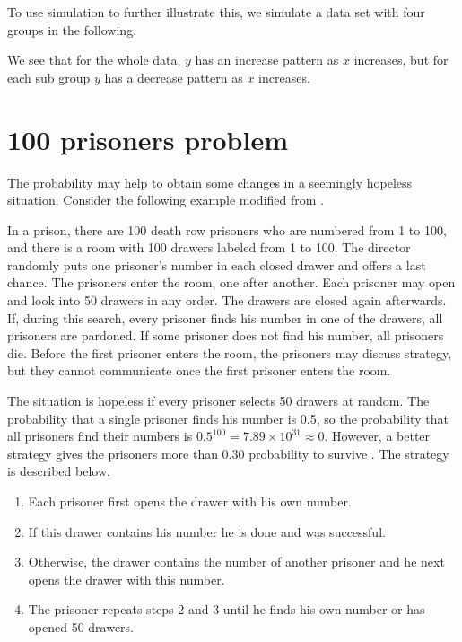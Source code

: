 To use simulation to further illustrate this, we simulate a data set
with four groups in the following.



We see that for the whole data, $y$ has an increase pattern as $x$
increases, but for each sub group $y$ has a decrease pattern as $x$
increases.

\hypertarget{prisoners-problem}{%
\section{100 prisoners problem}\label{prisoners-problem}}

The probability may help to obtain some changes in a seemingly
hopeless situation. Consider the following example modified from
\cite{flajolet2009analytic}.

In a prison, there are 100 death row prisoners who are numbered from 1
to 100, and there is a room with 100 drawers labeled from 1 to
100. The director randomly puts one prisoner's number in each closed
drawer and offers a last chance. The prisoners enter the room, one
after another. Each prisoner may open and look into 50 drawers in any
order. The drawers are closed again afterwards. If, during this
search, every prisoner finds his number in one of the drawers, all
prisoners are pardoned. If some prisoner does not find his number, all
prisoners die. Before the first prisoner enters the room, the
prisoners may discuss strategy, but they cannot communicate once the
first prisoner enters the room.

The situation is hopeless if every prisoner selects 50 drawers at
random. The probability that a single prisoner finds his number is
0.5, so the probability that all prisoners find their numbers is
$0.5^{100} = 7.89\times10^{31}\approx0$. However, a better strategy
gives the prisoners more than 0.30 probability to survive
\citep{stanley2013algebraic}. The strategy is described below.

\begin{enumerate}
\item Each prisoner first opens the drawer with his own number.
\item If this drawer contains his number he is done and was
  successful.
\item Otherwise, the drawer contains the number of another prisoner
  and he next opens the drawer with this number.
\item The prisoner repeats steps 2 and 3 until he finds his own number
  or has opened 50 drawers.
\end{enumerate}

